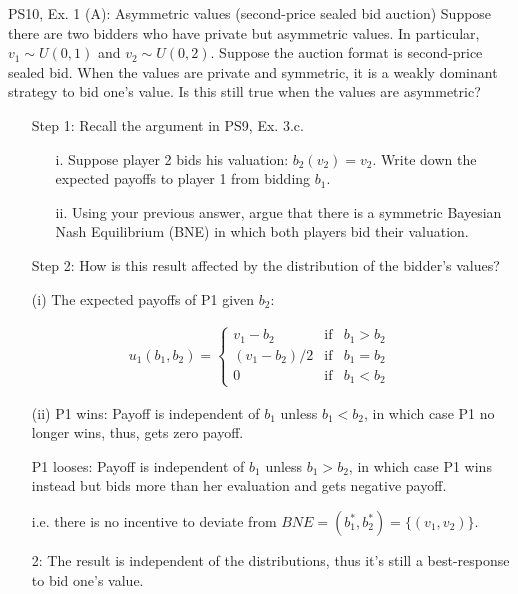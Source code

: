\begin{frame}{PS10, Ex. 1 (A): Asymmetric values (second-price sealed bid auction)}
    Suppose there are two bidders who have private but asymmetric values. In particular, $v_1\sim U(0, 1)$ and $v_2\sim U(0, 2)$. Suppose the auction format is second-price sealed bid. When the values are private and symmetric, it is a weakly dominant strategy to bid one’s value. Is this still true when the values are asymmetric?
    \begin{multicols}{2}
      \begin{itemize}
        \item[Step 1:] Recall the argument in PS9, Ex. 3.c.
        \begin{itemize}\normalsize
          \item[i.]   Suppose player 2 bids his valuation: $b_2(v_2) = v_2$. Write down the expected payoffs to player 1 from bidding $b_1$.
          \item[ii.]  Using your previous answer, argue that there is a symmetric Bayesian Nash Equilibrium (BNE) in which both players bid their valuation.
        \end{itemize}
        \item[Step 2:] How is this result affected by the distribution of the bidder's values?
      \end{itemize}
      \vfill\null\columnbreak
      \begin{itemize}
        \item[(i)] The expected payoffs of P1 given $b_2$:
      \end{itemize}
      \vspace{-12pt}
      \begin{align*}
        u_1(b_1,b_2)=\left\{\begin{array}{lcl}
          v_1-b_2     & \text{if} & b_1>b_2 \\
          (v_1-b_2)/2 & \text{if} & b_1=b_2 \\
          0           & \text{if} & b_1<b_2
        \end{array}\right.
      \end{align*}
      \vspace{-18pt}
      \begin{itemize}
        \item[(ii)] P1 wins: Payoff is independent of $b_1$ unless $b_1<b_2$, in which case P1 no longer wins, thus, gets zero payoff.
        \item[] P1 looses: Payoff is independent of $b_1$ unless $b_1>b_2$, in which case P1 wins instead but bids more than her evaluation and gets negative payoff.
        \item[] i.e. there is no incentive to deviate from $BNE=(b_1^*,b_2^*)=\{(v_1,v_2)\}$.
        \item[2:] The result is independent of the distributions, thus it's still a best-response to bid one's value.
      \end{itemize}
      \vfill\null
    \end{multicols}
\end{frame}




